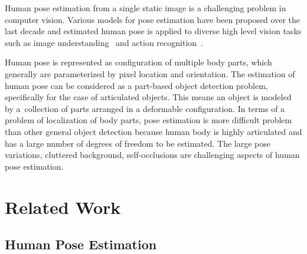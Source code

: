 \documentclass[master,english,final]{postech-ucs}
\begin{document}


Human pose estimation from a single static image is a challenging problem in computer vision. Various models for pose estimation have been proposed over the last decade and estimated human pose is applied to diverse high level vision tasks such as image understanding~\cite{imageUnderstanding:2013} and action recognition~\cite{actionRecognition:2013}.

Human pose is represented as configuration of multiple body parts, which generally are parameterized by pixel location and orientation. The estimation of human pose can be considered as a part-based object detection problem, specifically for the case of articulated objects. This means an object is modeled by a~collection of parts arranged in a deformable configuration. In terms of a problem of localization of body parts, pose estimation is more difficult problem than other general object detection because human body is highly articulated and has a large number of degrees of freedom to be estimated. The large pose variations, cluttered background, self-occlusions are challenging aspects of human pose estimation.



\chapter{Related Work}

\section{Human Pose Estimation}
\end{document}

